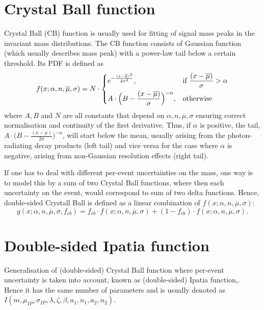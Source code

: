 \label{sec:PDFS}
\section{Crystal Ball function}
\label{CB}
Crystal Ball (\Gls{CB}) function \cite{Skwarnicki:1986xj}
is usually used for fitting of signal mass peaks in the invariant mass distributions. The \gls{CB} function consists of Gaussian function (which usually describes mass peak) with a power-law tail below a certain threshold. Its PDF is defined as
\begin{equation}
  f(x; \alpha,n,\overline{\mu},\sigma) = N \cdot
  \begin{dcases}
    e^{-\frac{(x-\overline{\mu})^{2}}{2\sigma^{2}}},& \text{if } \frac{(x-\overline{\mu})}{\sigma}  >\alpha\\
    A \cdot\Big(B - \frac{(x-\overline{\mu})}{\sigma}\Big)^{-n}, & \text{otherwise}
  \end{dcases}
  \label{Eq:CB}
\end{equation}
where $A, B$ and $N$ are all constants that depend on ${\alpha,n,\overline{\mu},\sigma}$ ensuring correct normalisation and continuity of the first derivative. Thus, if $\alpha$ is positive, the tail, $A\cdot \Big(B - \frac{(x-\overline{\mu})}{2\sigma}\Big)^{-n}$, will start below the mean, usually arising from the photon-radiating decay products (left tail) and vice versa for the case where $\alpha$ is negative, arising from non-Gaussian resolution effects (right tail).

If one has to deal with different per-event uncertainties on the mass, one way is to model this by a sum of two Crystal Ball functions, where then each uncertainty on the event, would correspond to sum of two delta functions. Hence, double-sided Crystall Ball is defined as a linear combination of $f(x; \alpha,n,\overline{\mu},\sigma)$:
\begin{equation}
	g(x; \alpha,n,\overline{\mu},\sigma, f_{cb}) = f_{cb} \cdot f(x; \alpha,n,\overline{\mu},\sigma) + (1-f_{cb})\cdot f(x; \alpha,n,\overline{\mu},\sigma).
\end{equation}


\section{Double-sided Ipatia function}
\label{IP}
Generalisation of (double-sided) Crystal Ball function where per-event uncertainty is taken into account, known as (double-sided) Ipatia function,\cite{Santos:2013gra}. 
Hence it has the same number of parameters and is usually denoted as $I(m,\mu_{IP},\sigma_{IP},\lambda,\zeta,\beta,a_{1},n_{1},a_{2},n_{2})$.


